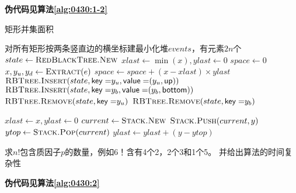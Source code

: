 \begin{questions}
\begin{parts}
\begin{solution}
            \textbf{伪代码见算法\ref{alg:0430:1-2}}
        \end{solution}

        \begin{algorithm}[!htp]
            \caption{矩形并集面积}\label{alg:0430:1-2}
            \begin{algorithmic}[1]
                 
                \State 对所有矩形按两条竖直边的横坐标建最小化堆$events$，有元素$2n$个 
                \State $state \gets \Call{RedBlackTree.New}{}$
                \State $xlast \gets \min(x), ylast \gets 0$
                \State $space \gets 0$
                \State $x, y_u, y_d \gets \Call{Extract}{e}$
                \State $space \gets space + (x-xlast) \times ylast$
                 
                \State $\Call{RBTree.Insert}{state, \mathsf{key=}y_u, \mathsf{value=}(y_u, \mathsf{up})}$
                \State $\Call{RBTree.Insert}{state, \mathsf{key=}y_b, \mathsf{value=}(y_b, \mathsf{bottom})}$
                 
                \State $\Call{RBTree.Remove}{state, \mathsf{key=}y_u}$
                \State $\Call{RBTree.Remove}{state, \mathsf{key=}y_b}$
                \EndIf

                \State $xlast \gets x, ylast \gets 0$ 
                \State $current \gets \Call{Stack.New}{}$
                \State $\Call{Stack.Push}{current, y}$
                \State $ytop \gets \Call{Stack.Pop}{current}$
                \State $ylast \gets ylast + (y - ytop)$
                \EndIf
                \EndIf
                \EndFor
                \EndFor
            \end{algorithmic}
        \end{algorithm}
    \end{parts}

    \question 求$n!$包含质因子$p$的数量，例如$6！$含有4个2，2个3和1个5。
    并给出算法的时间复杂性

    \begin{solution}
        \textbf{伪代码见算法\ref{alg:0430:2}}


\end{solution}
\end{questions}
